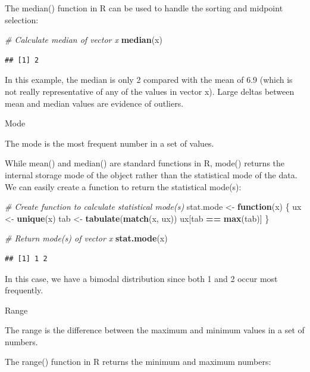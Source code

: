 \documentclass[]{book}
\newenvironment{Shaded}{\begin{snugshade}}{\end{snugshade}}
\newcommand{\CommentTok}[1]{\textcolor[rgb]{0.56,0.35,0.01}{\textit{#1}}}
\newcommand{\ControlFlowTok}[1]{\textcolor[rgb]{0.13,0.29,0.53}{\textbf{#1}}}
\newcommand{\KeywordTok}[1]{\textcolor[rgb]{0.13,0.29,0.53}{\textbf{#1}}}
\newcommand{\NormalTok}[1]{#1}
\newcommand{\OperatorTok}[1]{\textcolor[rgb]{0.81,0.36,0.00}{\textbf{#1}}}
\newcommand{\StringTok}[1]{\textcolor[rgb]{0.31,0.60,0.02}{#1}}
\begin{document}
The median() function in R can be used to handle the sorting and midpoint selection:

\begin{Shaded}
\begin{Highlighting}[]
\CommentTok{# Calculate median of vector x}
\KeywordTok{median}\NormalTok{(x)}
\end{Highlighting}
\end{Shaded}

\begin{verbatim}
## [1] 2
\end{verbatim}

In this example, the median is only 2 compared with the mean of 6.9 (which is not really representative of any of the values in vector x). Large deltas between mean and median values are evidence of outliers.

Mode

The mode is the most frequent number in a set of values.

While mean() and median() are standard functions in R, mode() returns the internal storage mode of the object rather than the statistical mode of the data. We can easily create a function to return the statistical mode(s):

\begin{Shaded}
\begin{Highlighting}[]
\CommentTok{# Create function to calculate statistical mode(s)}
\NormalTok{stat.mode <-}\StringTok{ }\ControlFlowTok{function}\NormalTok{(x) \{}
\NormalTok{  ux <-}\StringTok{ }\KeywordTok{unique}\NormalTok{(x)}
\NormalTok{  tab <-}\StringTok{ }\KeywordTok{tabulate}\NormalTok{(}\KeywordTok{match}\NormalTok{(x, ux))}
\NormalTok{  ux[tab }\OperatorTok{==}\StringTok{ }\KeywordTok{max}\NormalTok{(tab)]}
\NormalTok{\}}

\CommentTok{# Return mode(s) of vector x}
\KeywordTok{stat.mode}\NormalTok{(x)}
\end{Highlighting}
\end{Shaded}

\begin{verbatim}
## [1] 1 2
\end{verbatim}

In this case, we have a bimodal distribution since both 1 and 2 occur most frequently.

Range

The range is the difference between the maximum and minimum values in a set of numbers.

The range() function in R returns the minimum and maximum numbers:
\end{document}
